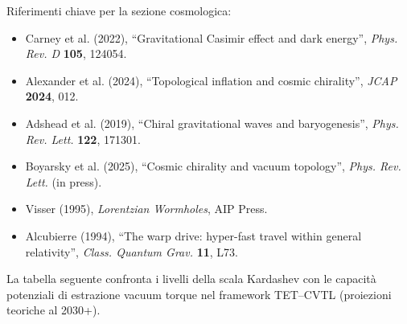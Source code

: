 \documentclass[11pt,a4paper]{article}
\theoremstyle{plain}
\theoremstyle{definition}
\begin{document}
Riferimenti chiave per la sezione cosmologica:
\begin{itemize}
    \item Carney et al. (2022), ``Gravitational Casimir effect and dark energy'', \emph{Phys. Rev. D} \textbf{105}, 124054.
    \item Alexander et al. (2024), ``Topological inflation and cosmic chirality'', \emph{JCAP} \textbf{2024}, 012.
    \item Adshead et al. (2019), ``Chiral gravitational waves and baryogenesis'', \emph{Phys. Rev. Lett.} \textbf{122}, 171301.
    \item Boyarsky et al. (2025), ``Cosmic chirality and vacuum topology'', \emph{Phys. Rev. Lett.} (in press).
    \item Visser (1995), \emph{Lorentzian Wormholes}, AIP Press.
    \item Alcubierre (1994), ``The warp drive: hyper-fast travel within general relativity'', \emph{Class. Quantum Grav.} \textbf{11}, L73.
\end{itemize}


La tabella seguente confronta i livelli della scala Kardashev con le capacità potenziali di estrazione vacuum torque nel framework TET--CVTL (proiezioni teoriche al 2030+).
\end{document}
